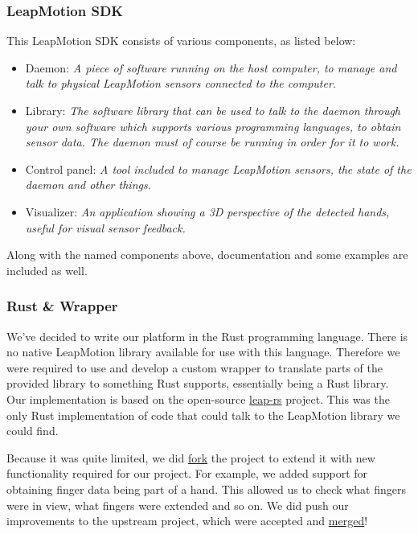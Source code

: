 \documentclass{standalone}
\begin{document}
  \subsubsection{LeapMotion SDK}
  This LeapMotion SDK consists of various components, as listed below:
  \begin{itemize}
    \tightlist{}
    \item Daemon: \textit{%
        A piece of software running on the host computer, to manage and talk
        to physical LeapMotion sensors connected to the computer.
      }
    \item Library: \textit{%
        The software library that can be used to talk to the daemon through
        your own software which supports various programming languages, to
        obtain sensor data. The daemon must of course be running in order for
        it to work.
      }
    \item Control panel: \textit{%
        A tool included to manage LeapMotion sensors, the state of the daemon
        and other things.
      }
    \item Visualizer: \textit{%
        An application showing a 3D perspective of the detected hands, useful
        for visual sensor feedback.
      }
  \end{itemize}
  Along with the named components above, documentation and some examples are
  included as well.

  \subsubsection{Rust \& Wrapper}
  We've decided to write our platform in the Rust programming language. There is
  no native LeapMotion library available for use with this language. Therefore
  we were required to use and develop a custom wrapper to translate parts of the
  provided library to something Rust supports, essentially being a Rust library.
  Our implementation is based on the open-source
  \href{https://github.com/panicbit/leap-rs}{leap-rs} project. This was the only
  Rust implementation of code that could talk to the LeapMotion library we could
  find.

  Because it was quite limited, we did
  \href{https://github.com/timvisee/leap-rs}{fork}
  the project to extend it with new functionality required for our project.
  For example, we added support for obtaining finger data being part of a hand.
  This allowed us to check what fingers were in view, what fingers were extended
  and so on.
  We did push our improvements to the upstream project, which were accepted and
  \href{https://github.com/panicbit/leap-rs/pulls?utf8=%E2%9C%93&q=is%3Apr+is%3Aclosed+author%3Atimvisee}{merged}!
\end{document}
